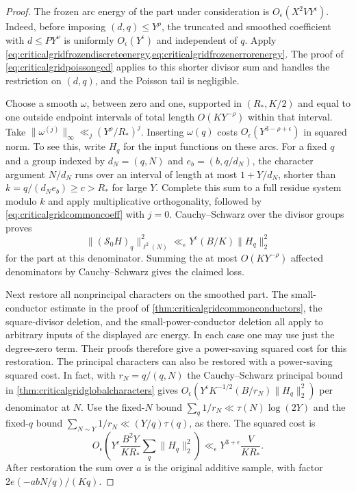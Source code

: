 \documentclass[11pt,a4paper]{article}
\numberwithin{equation}{section}
\begin{document}
\begin{proof}
The frozen arc energy of the part under consideration is
$O_\epsilon(X^2 VY^\epsilon)$. Indeed, before imposing
$(d,q)\le Y^\rho$, the truncated and smoothed coefficient
with $d\le P Y^\nu$ is uniformly $O_\epsilon(Y^\epsilon)$
and independent of $q$. Apply
\cref{eq:criticalgridfrozendiscreteenergy,eq:criticalgridfrozenerrorenergy}.
The proof of \cref{eq:criticalgridpoissongcd} applies to
this shorter divisor sum and handles the restriction on
$(d,q)$, and the Poisson tail is negligible.

Choose a smooth $\omega$, between zero and one, supported
in $(R_*,K/2)$ and equal to one outside endpoint intervals
of total length $O(KY^{-\rho})$ within that interval.
Take $\|\omega^{(j)}\|_\infty\ll_j (Y^\rho/R_*)^j$.
Inserting $\omega(q)$ costs $O_\epsilon(Y^{3-\rho+\epsilon})$
in squared norm. To see this, write $H_q$ for the input
functions on these arcs. For a fixed $q$ and a group
indexed by $d_N=(q,N)$ and $e_b=(b,q/d_N)$, the
character argument $N/d_N$ runs over an interval of
length at most $1+Y/d_N$, shorter than
$k=q/(d_N e_b)\ge c>R_*$ for large $Y$.
Complete this sum to a full residue system modulo $k$
and apply multiplicative orthogonality, followed by
\cref{eq:criticalgridcommoncoeff} with $j=0$.
Cauchy--Schwarz over the divisor groups proves
\[
 \|(\mathcal S_0 H)_q\|_{\ell^2(N)}^2
       \ll_\epsilon Y^\epsilon (B/K)\|H_q\|_2^2
\]
for the part at this denominator. Summing the at most
$O(KY^{-\rho})$ affected denominators by Cauchy--Schwarz
gives the claimed loss.

Next restore all nonprincipal characters on the smoothed
part. The small-conductor estimate in the proof of
\cref{thm:criticalgridcommonconductors}, the square-divisor
deletion, and the small-power-conductor deletion all apply
to arbitrary inputs of the displayed arc energy. In each
case one may use just the degree-zero term. Their proofs
therefore give a power-saving squared cost for this
restoration. The principal characters can also be restored
with a power-saving squared cost. In fact, with
$r_N=q/(q,N)$ the Cauchy--Schwarz principal bound in
\cref{thm:criticalgridglobalcharacters} gives
$O_\epsilon(Y^\epsilon K^{-1/2}(B/r_N)\|H_q\|_2^2)$
per denominator at $N$. Use the fixed-$N$ bound
$\sum_q1/r_N\ll \tau(N)\log(2Y)$ and the fixed-$q$ bound
$\sum_{N\sim Y}1/r_N\ll (Y/q)\tau(q)$, as there.
The squared cost is
\[
 O_\epsilon\!\left(
   Y^\epsilon\frac{B^2Y}{K R_*}\sum_q\|H_q\|_2^2\right)
 \ll_\epsilon Y^{3+\epsilon}\frac{V}{K R_*}.
\]
After restoration the sum over $a$ is the original additive
sample, with factor $2e(-a bN/q)/(Kq)$.


\end{proof}
\end{document}
